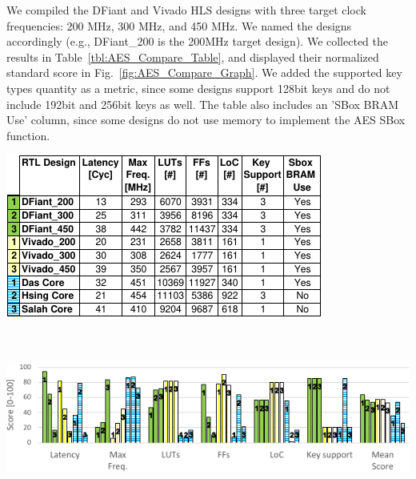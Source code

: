 
We compiled the DFiant and Vivado HLS designs with three target clock frequencies: 200 MHz, 300 MHz, and 450 MHz. We named the designs accordingly (e.g., DFiant\_200 is the 200MHz target design). We collected the results in Table~\ref{tbl:AES_Compare_Table}, and displayed their normalized standard score in Fig.~\ref{fig:AES_Compare_Graph}. We added the supported key types quantity as a metric, since some designs support 128bit keys and do not include 192bit and 256bit keys as well. The table also includes an 'SBox BRAM Use' column, since some designs do not use memory to implement the AES SBox function.

\begin{table}[t!]
  \centering
	\setlength\tabcolsep{2pt}
	\scriptsize
  \begin{minipage}[t][6.5cm][t]{0.8\linewidth}
    \centering
    \label{tbl:AES_Compare_Table}
    \includegraphics[scale=1.2]{graphics/AES_Compare_Table.pdf} 
  \end{minipage}%
  \\
  \begin{minipage}[b][3.8cm][b]{\linewidth}
  	\centering
    \includegraphics[height=3.8cm]{graphics/AES_Compare.pdf} 
    \label{fig:AES_Compare_Graph}
  \end{minipage}
\end{table}

